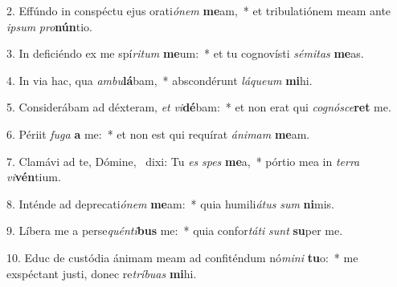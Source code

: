 2. Effúndo in conspéctu ejus orati\textit{ó}\textit{nem} \textbf{me}am,~*  et tribulatiónem meam ante \textit{ip}\textit{sum} \textit{pro}\textbf{nún}tio.\

3. In deficiéndo ex me spí\textit{ri}\textit{tum} \textbf{me}um:~*  et tu cognovísti \textit{sé}\textit{mi}\textit{tas} \textbf{me}as.\

4. In via hac, qua \textit{am}\textit{bu}\textbf{lá}bam,~*  abscondérunt \textit{lá}\textit{que}\textit{um} \textbf{mi}hi.\

5. Considerábam ad déxteram, \textit{et} \textit{vi}\textbf{dé}bam:~*  et non erat qui \textit{co}\textit{gnó}\textit{sce}\textbf{ret} me.\

6. Périit \textit{fu}\textit{ga} \textbf{a} me:~*  et non est qui requírat \textit{á}\textit{ni}\textit{mam} \textbf{me}am.\

7. Clamávi ad te, Dómine, \dag\  dixi: Tu \textit{es} \textit{spes} \textbf{me}a,~*  pórtio mea in \textit{ter}\textit{ra} \textit{vi}\textbf{vén}tium.\

8. Inténde ad deprecati\textit{ó}\textit{nem} \textbf{me}am:~*  quia humili\textit{á}\textit{tus} \textit{sum} \textbf{ni}mis.\

9. Líbera me a perse\textit{quén}\textit{ti}\textbf{bus} me:~*  quia confor\textit{tá}\textit{ti} \textit{sunt} \textbf{su}per me.\

10. Educ de custódia ánimam meam ad confiténdum nó\textit{mi}\textit{ni} \textbf{tu}o:~*  me exspéctant justi, donec re\textit{trí}\textit{bu}\textit{as} \textbf{mi}hi.\

